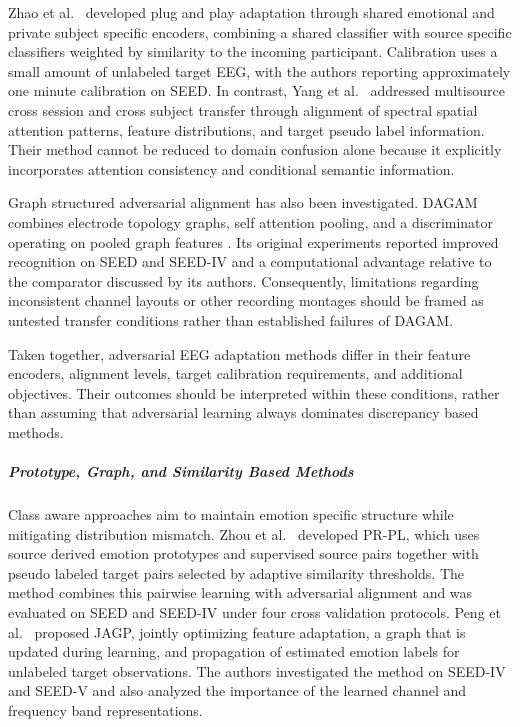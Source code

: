 \documentclass[ASNA,twocolumn]{USG}
\begin{document}
Zhao et al.~\cite{zhao2021plug} developed plug and play adaptation through shared emotional and private subject specific encoders, combining a shared classifier with source specific classifiers weighted by similarity to the incoming participant. Calibration uses a small amount of unlabeled target EEG, with the authors reporting approximately one minute calibration on SEED. In contrast, Yang et al.~\cite{yang2024spectral} addressed multisource cross session and cross subject transfer through alignment of spectral spatial attention patterns, feature distributions, and target pseudo label information. Their method cannot be reduced to domain confusion alone because it explicitly incorporates attention consistency and conditional semantic information.

Graph structured adversarial alignment has also been investigated. DAGAM combines electrode topology graphs, self attention pooling, and a discriminator operating on pooled graph features \cite{xu2023dagam}. Its original experiments reported improved recognition on SEED and SEED-IV and a computational advantage relative to the comparator discussed by its authors. Consequently, limitations regarding inconsistent channel layouts or other recording montages should be framed as untested transfer conditions rather than established failures of DAGAM.

Taken together, adversarial EEG adaptation methods differ in their feature encoders, alignment levels, target calibration requirements, and additional objectives. Their outcomes should be interpreted within these conditions, rather than assuming that adversarial learning always dominates discrepancy based methods.

\subparagraph{Prototype, Graph, and Similarity Based Methods}

Class aware approaches aim to maintain emotion specific structure while mitigating distribution mismatch. Zhou et al.~\cite{zhou2023pr} developed PR-PL, which uses source derived emotion prototypes and supervised source pairs together with pseudo labeled target pairs selected by adaptive similarity thresholds. The method combines this pairwise learning with adversarial alignment and was evaluated on SEED and SEED-IV under four cross validation protocols. Peng et al.~\cite{peng2022joint} proposed JAGP, jointly optimizing feature adaptation, a graph that is updated during learning, and propagation of estimated emotion labels for unlabeled target observations. The authors investigated the method on SEED-IV and SEED-V and also analyzed the importance of the learned channel and frequency band representations.
\end{document}
